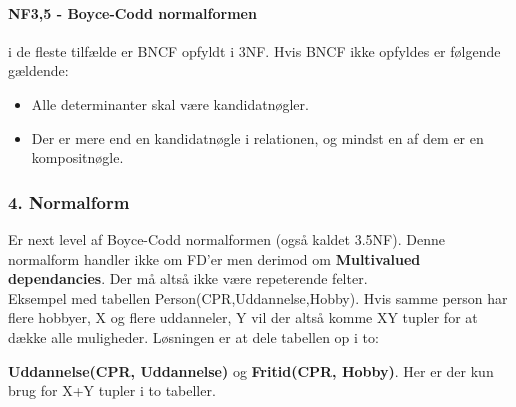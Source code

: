 \paragraph{NF3,5 - Boyce-Codd normalformen} i de fleste tilfælde er BNCF opfyldt i 3NF. Hvis BNCF ikke opfyldes er følgende gældende:
	
\begin{itemize}
	\item Alle determinanter skal være kandidatnøgler.
	\item Der er mere end en kandidatnøgle i relationen, og mindst en af dem er en kompositnøgle.
\end{itemize}
	
\subsubsection{4. Normalform}
Er next level af Boyce-Codd normalformen (også kaldet 3.5NF). Denne normalform handler ikke om FD'er men derimod om \textbf{Multivalued dependancies}. Der må altså ikke være repeterende felter.\\

Eksempel med tabellen Person(CPR,Uddannelse,Hobby). Hvis samme person har flere hobbyer, X og flere uddanneler, Y vil der altså komme XY tupler for at dække alle muligheder. Løsningen er at dele tabellen op i to: 

\textbf{Uddannelse(CPR, Uddannelse)} og \textbf{Fritid(CPR, Hobby)}. Her er der kun brug for X+Y tupler i to tabeller.

